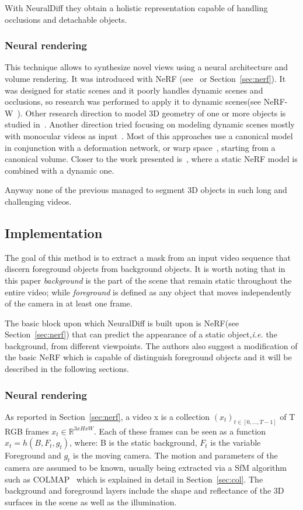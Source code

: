 With NeuralDiff they obtain a holistic representation capable of handling occlusions
and detachable objects.

\subsubsection{Neural rendering}
This technique allows to synthesize novel views using a neural architecture and volume rendering.
It was introduced with NeRF (see~\cite{nerf} or Section~\ref{sec:nerf}). It was designed for static
scenes and it poorly handles dynamic scenes and occlusions, so research was performed to
apply it to dynamic scenes(see NeRF-W~\cite{ndiff_17}). Other research direction
to model 3D geometry of one or more objects is studied in~\cite{ndiff_30}.
Another direction tried focusing on modeling dynamic scenes mostly with monocular 
videos as input~\cite{ndiff_15,ndiff_34}. Most  of this approaches use a 
canonical model in conjunction with a deformation network, or warp space~\cite{ndiff_34},
starting from a canonical volume. Closer to the work presented is~\cite{ndiff_15},
where a static NeRF model is combined with a dynamic one.

Anyway none of the previous managed to segment 3D objects in such long and challenging videos.

\subsection{Implementation}
The goal of this method is to extract a mask from an input video sequence that discern foreground
objects from background objects. It is worth noting that in this paper \textit{background} is 
the part of the scene that remain static throughout the entire video; while \textit{foreground}
is defined as any object that moves independently of the camera in at least one frame.

The basic block upon which NeuralDiff is built upon is NeRF(see Section~\ref{sec:nerf}) that can predict
the appearance of a static object,\textit{i.e.} the background, from different viewpoints. 
The authors also suggest a modification of the basic NeRF which is capable of 
distinguish foreground objects and it will be described in the following sections.

\subsubsection{Neural rendering}
As reported in Section~\ref{sec:nerf}, a video x is a collection $(x_t)_{t\in[0,...,T-1]}$
of T RGB frames $x_t \in \mathbb{R}^{3xHxW}$. Each of these frames can be seen as 
a function $x_t = h(B,F_t,g_t)$, where: B is the static background, $F_t$ is the variable
Foreground and $g_t$ is the moving camera. The motion and parameters of the camera are assumed
to be known, usually being extracted via a SfM algorithm such as COLMAP~\cite{colmap} which is 
explained in detail in Section~\ref{sec:col}. The background and foreground layers include the shape 
and reflectance of the 3D surfaces in the scene as well as the illumination.

